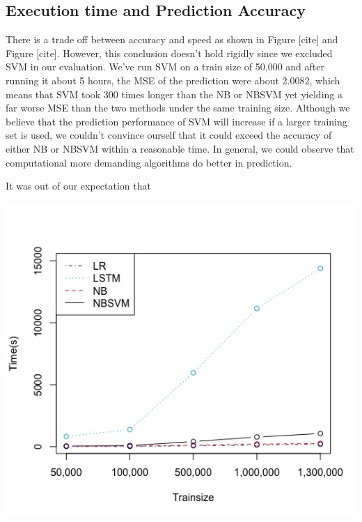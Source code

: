\documentclass[letterpaper]{article} %
\begin{document}
\subsection{Execution time and Prediction Accuracy}
There is a trade off between accuracy and speed as shown in Figure [cite] and Figure [cite]. However, this conclusion doesn't hold rigidly since we excluded SVM in our evaluation. We've run SVM on a train size of 50,000 and after running it about 5 hours, the MSE of the prediction were about 2.0082, which means that SVM took 300 times longer than the NB or NBSVM yet yielding a far worse MSE than the two methods under the same training size. Although we believe that the prediction performance of SVM will increase if a larger training set is used, we couldn't convince ourself that it could exceed the accuracy of either NB or NBSVM within a reasonable time. In general, we could observe that computational more demanding algorithms do better in prediction.

It was out of our expectation that 



\begin{center}
\centering
\includegraphics[width=\columnwidth]{../Plots/Compare_runtime.jpeg}
\end{center}
\end{document}
